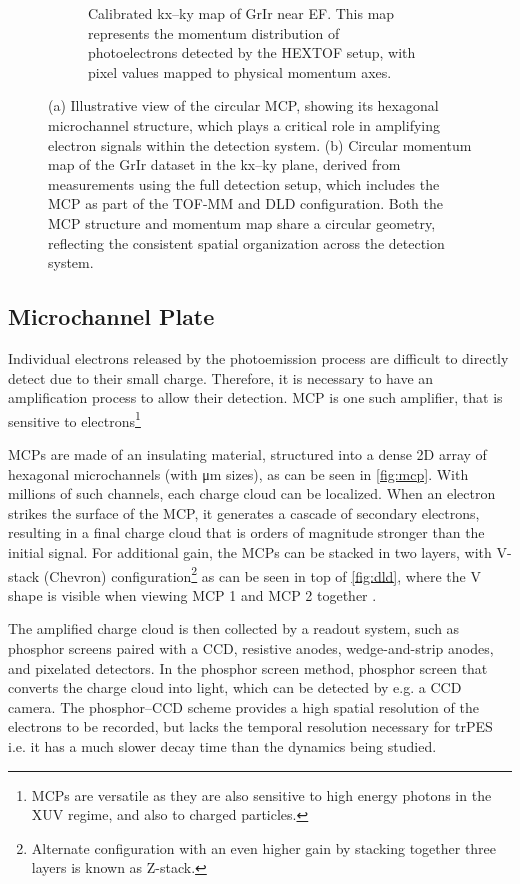 \begin{figure}[h]
\begin{subfigure}[t]{0.49\linewidth}
        \caption{Calibrated \gls{kx}--\gls{ky} map of \gls{GrIr} near \gls{EF}. This map represents the momentum distribution of photoelectrons detected by the \gls{HEXTOF} setup, with pixel values mapped to physical momentum axes.}
        \label{fig:grir-2d-slice-calibrated}
    \end{subfigure}
    \caption{(a) Illustrative view of the circular \gls{MCP}, showing its hexagonal microchannel structure, which plays a critical role in amplifying electron signals within the detection system. (b) Circular momentum map of the \gls{GrIr} dataset in the \gls{kx}--\gls{ky} plane, derived from measurements using the full detection setup, which includes the \gls{MCP} as part of the \gls{TOF}-\gls{MM} and \gls{DLD} configuration. Both the MCP structure and momentum map share a circular geometry, reflecting the consistent spatial organization across the detection system.}
    \label{fig:combined-figures}
\end{figure}

\subsection*{Microchannel Plate}
Individual electrons released by the photoemission process are difficult to directly detect due to their small charge.  Therefore, it is necessary to have an amplification process to allow their detection. \Gls{MCP} is one such amplifier, that is sensitive to electrons\footnote{\Glspl{MCP} are versatile as they are also sensitive to high energy photons in the \gls{XUV} regime, and also to charged particles.}

\Glspl{MCP} are made of an insulating material, structured into a dense 2D array of hexagonal microchannels (with \unit{\micro\meter} sizes), as can be seen in \cref{fig:mcp}. With millions of such channels, each charge cloud can be localized. When an electron strikes the surface of the \gls{MCP}, it generates a cascade of secondary electrons, resulting in a final charge cloud that is orders of magnitude stronger than the initial signal. For additional gain, the \glspl{MCP} can be stacked in two layers, with V-stack (Chevron) configuration\footnote{Alternate configuration with an even higher gain by stacking together three layers is known as Z-stack.}
as can be seen in top of \cref{fig:dld}, where the V shape is visible when viewing MCP 1 and MCP 2 together \cite{ladislaswizaMicrochannelPlateDetectors1979,paschottaMicrochannelPlatesEncyclopedia2019}. 

The amplified charge cloud is then collected by a readout system, such as  phosphor screens paired with a \gls{CCD}, resistive anodes, wedge-and-strip anodes, and pixelated detectors. In the phosphor screen method, phosphor screen that converts the charge cloud into light, which can be detected by e.g. a \gls{CCD} camera. The phosphor--\gls{CCD} scheme provides a high spatial resolution of the electrons to be recorded, but lacks the temporal resolution necessary for \gls{trPES} i.e. it has a much slower decay time than the dynamics being studied.


